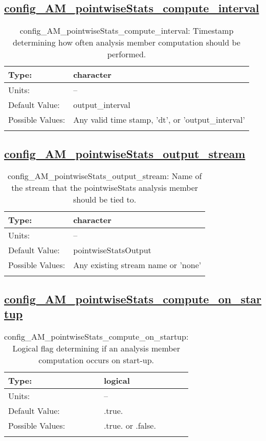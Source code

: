 \subsection[config\_AM\_pointwiseStats\_compute\_interval]{\hyperref[sec:nm_tab_AM_pointwiseStats]{config\_AM\_pointwiseStats\_compute\_interval}}
\label{subsec:nm_sec_config_AM_pointwiseStats_compute_interval}
\begin{center}
\begin{longtable}{| p{2.0in} || p{4.0in} |}
    \hline
    Type: & character \\
    \hline
    Units: & -- \\
    \hline
    Default Value: & output\_interval \\
    \hline
    Possible Values: & Any valid time stamp, 'dt', or 'output\_interval' \\
    \hline
    \caption{config\_AM\_pointwiseStats\_compute\_interval: Timestamp determining how often analysis member computation should be performed.}
\end{longtable}
\end{center}
\subsection[config\_AM\_pointwiseStats\_output\_stream]{\hyperref[sec:nm_tab_AM_pointwiseStats]{config\_AM\_pointwiseStats\_output\_stream}}
\label{subsec:nm_sec_config_AM_pointwiseStats_output_stream}
\begin{center}
\begin{longtable}{| p{2.0in} || p{4.0in} |}
    \hline
    Type: & character \\
    \hline
    Units: & -- \\
    \hline
    Default Value: & pointwiseStatsOutput \\
    \hline
    Possible Values: & Any existing stream name or 'none' \\
    \hline
    \caption{config\_AM\_pointwiseStats\_output\_stream: Name of the stream that the pointwiseStats analysis member should be tied to.}
\end{longtable}
\end{center}
\subsection[config\_AM\_pointwiseStats\_compute\_on\_startup]{\hyperref[sec:nm_tab_AM_pointwiseStats]{config\_AM\_pointwiseStats\_compute\_on\_startup}}
\label{subsec:nm_sec_config_AM_pointwiseStats_compute_on_startup}
\begin{center}
\begin{longtable}{| p{2.0in} || p{4.0in} |}
    \hline
    Type: & logical \\
    \hline
    Units: & -- \\
    \hline
    Default Value: & .true. \\
    \hline
    Possible Values: & .true. or .false. \\
    \hline
    \caption{config\_AM\_pointwiseStats\_compute\_on\_startup: Logical flag determining if an analysis member computation occurs on start-up.}
\end{longtable}
\end{center}
